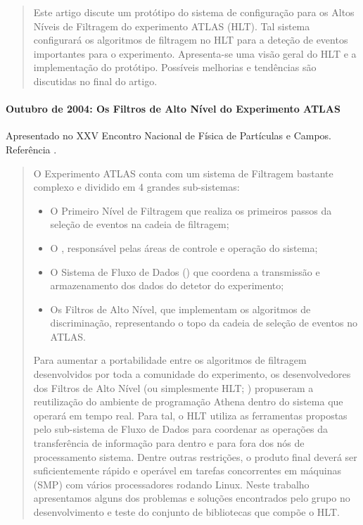 \begin{quotation}
Este artigo discute um protótipo do sistema de configuração para os Altos
Níveis de Filtragem do experimento ATLAS (HLT). Tal sistema configurará os
algoritmos de filtragem no HLT para a deteção de eventos importantes para o
experimento. Apresenta-se uma visão geral do HLT e a implementação do
protótipo. Possíveis melhorias e tendências são discutidas no final do artigo.
\end{quotation}

\paragraph{Outubro de 2004: Os Filtros de Alto Nível do Experimento ATLAS}
Apresentado no XXV Encontro Nacional de Física de Partículas e
Campos. Referência \cite{aa:enfpc-04}.

\begin{quotation}
O Experimento ATLAS conta com um sistema de Filtragem bastante complexo e
dividido em 4 grandes sub-sistemas:
\begin{itemize}
\item O Primeiro Nível de Filtragem que realiza os primeiros passos da seleção
de eventos na cadeia de filtragem;
\item O , responsável pelas áreas de controle e operação
do sistema; 
\item O Sistema de Fluxo de Dados () que coordena a transmissão
e armazenamento dos dados do detetor do experimento;
\item Os Filtros de Alto Nível, que implementam os algoritmos de
discriminação, representando o topo da cadeia de seleção de eventos no ATLAS.
\end{itemize}
Para aumentar a portabilidade entre os algoritmos de filtragem desenvolvidos
por toda a comunidade do experimento, os desenvolvedores dos Filtros de Alto
Nível (ou simplesmente HLT; ) propuseram a
reutilização do ambiente de programação  Athena dentro do sistema
que operará em tempo real. Para tal, o HLT utiliza as ferramentas propostas
pelo sub-sistema de Fluxo de Dados para coordenar as operações da
transferência de informação para dentro e para fora dos nós de processamento
sistema. Dentre outras restrições, o produto final deverá ser suficientemente
rápido e operável em tarefas concorrentes em máquinas (SMP) com vários
processadores rodando Linux.  Neste trabalho apresentamos alguns dos problemas
e soluções encontrados pelo grupo no desenvolvimento e teste do conjunto de
bibliotecas que compõe o HLT.
\end{quotation}

